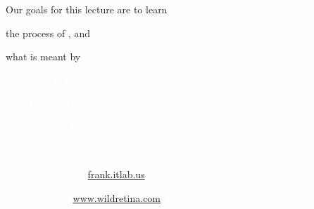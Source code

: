 \documentclass[t,handout]{beamer}  %
\newcommand{\ccby}[1]{%
	\ifx&#1&
	{\textsc{cc by}}%
\else
	{\textsc{cc by #1.0}}
\fi}
\newcommand{\ccbysa}[1]{%
	\ifx&#1&
	{\textsc{cc by-sa}}%
\else
	{\textsc{cc by-sa #1.0}} 
\fi}
\newcommand{\ccbyncsa}[1]{%
	\ifx&#1&
	{\textsc{cc by-nc-sa}}%
\else
	{\textsc{cc by-nc-sa #1.0}}
\fi}
\begin{document}
\begin{frame}[t]{Our goals for this lecture are to learn}

	
	\hangpara	the process of , and

	\hangpara what is meant by 
	
\end{frame}

%
{
\begin{frame}
\end{frame}
}
%
{
\begin{frame}[plain]
\end{frame}
}

{
\begin{frame}[b,plain]
\hfill\textcolor{white}{\tiny \textcopyright Entomart, Wikimedia}
\end{frame}
}
{
\begin{frame}[b]
\tiny\textcolor{white}{Silke Baron, Wikimedia \ccby{2}}
\end{frame}
}
%
{
\begin{frame}[b]
\hfill\textcolor{white}{\tiny Pierre Dalous, Wikimedia, \ccbysa{}}
\end{frame}
}
%
{
\begin{frame}[b]
\hfill\textcolor{white}{\tiny \textcopyright Dustin Siegel, with permission.}
\end{frame}
}
%
{
\begin{frame}[b]
\hfill\textcolor{white}{\tiny C. Frank Starmer, \href{http://frank.itlab.us}{frank.itlab.us},\ccbyncsa{}}
\end{frame}
}
%
{
\begin{frame}[b]
\hfill\textcolor{white}{\tiny David Carillet, \href{http://www.wildretina.com}{www.wildretina.com}, \ccbyncsa{3}}
\end{frame}
}
\end{document}
